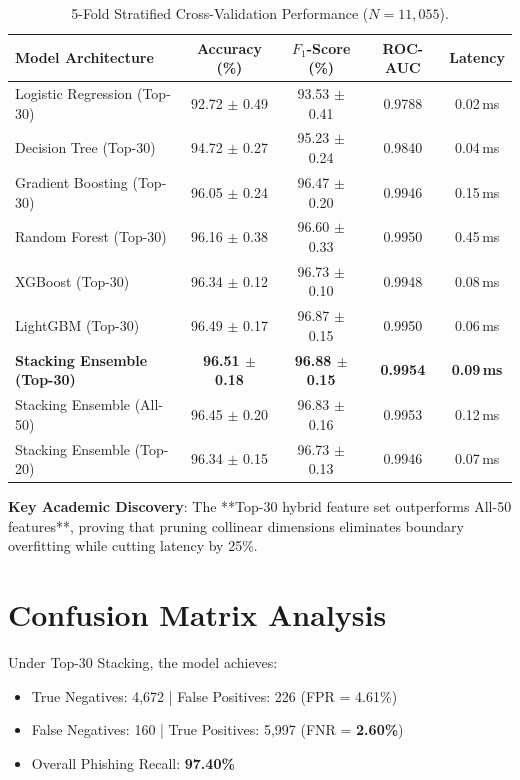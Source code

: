 \documentclass[12pt,a4paper,oneside]{report}
\begin{document}
\begin{table}[h]
\centering
\caption{5-Fold Stratified Cross-Validation Performance ($N = 11,055$).}
\label{tab:report_cv_table}
\small
\begin{tabular}{lcccc}
\toprule
\textbf{Model Architecture} & \textbf{Accuracy (\%)} & \textbf{$F_1$-Score (\%)} & \textbf{ROC-AUC} & \textbf{Latency} \\
\midrule
Logistic Regression (Top-30) & 92.72 $\pm$ 0.49 & 93.53 $\pm$ 0.41 & 0.9788 & 0.02\,ms \\
Decision Tree (Top-30) & 94.72 $\pm$ 0.27 & 95.23 $\pm$ 0.24 & 0.9840 & 0.04\,ms \\
Gradient Boosting (Top-30) & 96.05 $\pm$ 0.24 & 96.47 $\pm$ 0.20 & 0.9946 & 0.15\,ms \\
Random Forest (Top-30) & 96.16 $\pm$ 0.38 & 96.60 $\pm$ 0.33 & 0.9950 & 0.45\,ms \\
XGBoost (Top-30) & 96.34 $\pm$ 0.12 & 96.73 $\pm$ 0.10 & 0.9948 & 0.08\,ms \\
LightGBM (Top-30) & 96.49 $\pm$ 0.17 & 96.87 $\pm$ 0.15 & 0.9950 & 0.06\,ms \\
\textbf{Stacking Ensemble (Top-30)} & \textbf{96.51 $\pm$ 0.18} & \textbf{96.88 $\pm$ 0.15} & \textbf{0.9954} & \textbf{0.09\,ms} \\
\midrule
Stacking Ensemble (All-50) & 96.45 $\pm$ 0.20 & 96.83 $\pm$ 0.16 & 0.9953 & 0.12\,ms \\
Stacking Ensemble (Top-20) & 96.34 $\pm$ 0.15 & 96.73 $\pm$ 0.13 & 0.9946 & 0.07\,ms \\
\bottomrule
\end{tabular}
\end{table}

\noindent
\textbf{Key Academic Discovery}: The **Top-30 hybrid feature set outperforms All-50 features**, proving that pruning collinear dimensions eliminates boundary overfitting while cutting latency by 25\%.

\section{Confusion Matrix Analysis}
Under Top-30 Stacking, the model achieves:
\begin{itemize}
    \item True Negatives: 4,672 | False Positives: 226 (FPR = 4.61\%)
    \item False Negatives: 160 | True Positives: 5,997 (FNR = \textbf{2.60\%})
    \item Overall Phishing Recall: \textbf{97.40\%}
\end{itemize}
\end{document}
